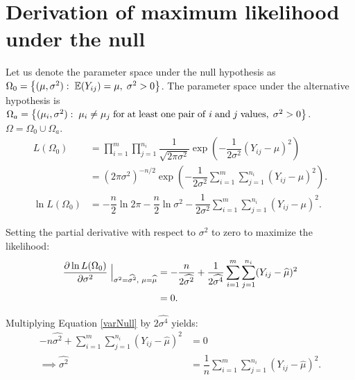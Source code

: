 \documentclass[12pt,a4paper,openright]{article}
\newcommand{\E}{\mathbb{E}}
\newcommand{\eqn}[1]{Equation \ref{#1}}
\newcommand{\wmu}{\widehat{\mu}}
\newcommand{\wst}{\widehat{\sigma^2}}
\begin{document}
	\section{Derivation of maximum likelihood under the null}
	Let us denote the parameter space under the null hypothesis as $\Omega_0 = \left\{(\mu, \sigma^2):\hspace{0.1cm} \E(Y_{ij}) = \mu, \hspace{0.1cm}\sigma^2 > 0\right\}$. The parameter space under the alternative hypothesis is $\Omega_a = \left\{(\mu_i, \sigma^2): \hspace{0.1cm}\mu_i \neq \mu_j \hspace{0.1cm}\mathrm{for\hspace{0.1cm}at\hspace{0.1cm}least\hspace{0.1cm}one\hspace{0.1cm}pair\hspace{0.1cm}of\hspace{0.1cm}}i\mathrm{\hspace{0.1cm}and\hspace{0.1cm}}j\mathrm{\hspace{0.1cm}values},\hspace{0.1cm} \sigma^2 > 0\right\}$. $\Omega = \Omega_0 \cup \Omega_a$. 
	\begin{align}
		L(\Omega_0) &= \prod_{i=1}^m \prod_{j=1}^{n_i} \dfrac{1}{\sqrt{2\pi \sigma^2}} \exp{\left(-\dfrac{1}{2\sigma^2} (Y_{ij}-\mu)^2\right)} \nonumber\\
		&= (2\pi \sigma^2)^{-n/2}\exp{\left(-\dfrac{1}{2\sigma^2} \sum_{i=1}^m \sum_{j=1}^{n_i} (Y_{ij}-\mu)^2\right)}. \label{LH0}\\
		\ln{L(\Omega_0)} &= -\dfrac{n}{2} \ln{2\pi} - \dfrac{n}{2}\ln{\sigma^2} - \dfrac{1}{2\sigma^2} \sum_{i=1}^m \sum_{j=1}^{n_i} (Y_{ij}-\mu)^2. \nonumber
	\end{align}

	Setting the partial derivative with respect to $\sigma^2$ to zero to maximize the likelihood:
	\begin{align}
		\dfrac{\partial \ln{L(\Omega_0)}}{\partial \sigma^2} \Bigm\lvert_{\sigma^2=\wst, \hspace{0.1cm}\mu = \wmu} &= -\dfrac{n}{2\wst} + \dfrac{1}{2\widehat{\sigma^4}}\sum_{i=1}^m \sum_{j=1}^{n_i} (Y_{ij}-\wmu)^2 \nonumber\\
		&= 0. \label{varNull}
	\end{align}

	Multiplying \eqn{varNull} by $2\widehat{\sigma^4}$ yields:
	\begin{align}
		-n\wst + \sum_{i=1}^m \sum_{j=1}^{n_i} (Y_{ij}-\wmu)^2 &= 0\nonumber\\
		\implies \wst &= \dfrac{1}{n} \sum_{i=1}^m \sum_{j=1}^{n_i} (Y_{ij}-\hat{\mu})^2. \label{wst0}
	\end{align}
\end{document}
